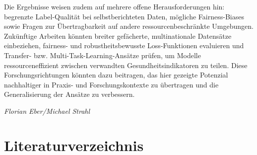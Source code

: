 \documentclass[10pt]{scrartcl}
\begin{document}
Die Ergebnisse weisen zudem auf mehrere offene Herausforderungen hin: begrenzte Label-Qualität bei selbstberichteten Daten, mögliche Fairness-Biases sowie Fragen zur Übertragbarkeit auf andere ressourcenbeschränkte Umgebungen. Zukünftige Arbeiten könnten breiter gefächerte, multinationale Datensätze einbeziehen, fairness- und robustheitsbewusste Loss-Funktionen evaluieren und Transfer- bzw. Multi-Task-Learning-Ansätze prüfen, um Modelle ressourceneffizient zwischen verwandten Gesundheitsindikatoren zu teilen. Diese Forschungsrichtungen könnten dazu beitragen, das hier gezeigte Potenzial nachhaltiger in Praxis- und Forschungskontexte zu übertragen und die Generalisierung der Ansätze zu verbessern.

\begin{flushright}
  \footnotesize\textit{Florian Eber/Michael Strahl}
\end{flushright}








\section{Literaturverzeichnis }
\end{document}
